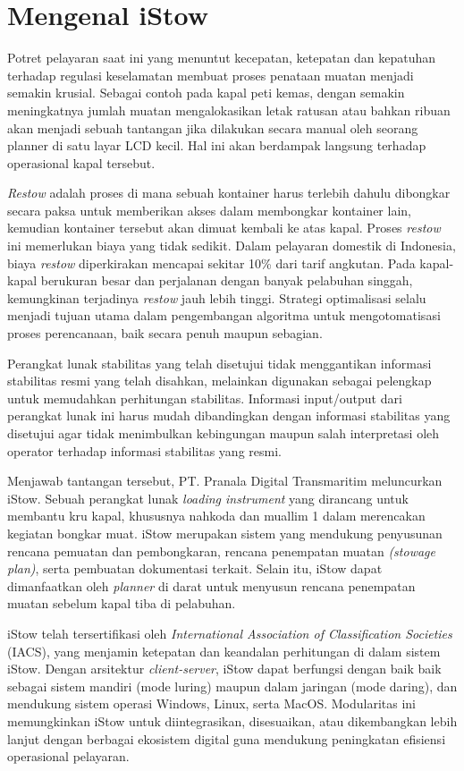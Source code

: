 \chapter{Mengenal iStow}
\label{ch:mengenal-iStow}


Potret pelayaran saat ini yang menuntut kecepatan, ketepatan dan kepatuhan terhadap regulasi keselamatan membuat proses penataan muatan menjadi semakin krusial. Sebagai contoh pada kapal peti kemas, dengan semakin meningkatnya jumlah muatan mengalokasikan letak ratusan atau bahkan ribuan akan menjadi sebuah tantangan jika dilakukan secara manual oleh seorang planner di satu layar LCD kecil. Hal ini akan berdampak langsung terhadap operasional kapal tersebut.

{ \em Restow} adalah proses di mana sebuah kontainer harus terlebih dahulu dibongkar secara paksa untuk memberikan akses dalam membongkar kontainer lain, kemudian kontainer tersebut akan dimuat kembali ke atas kapal. Proses {\em restow} ini memerlukan biaya yang tidak sedikit. Dalam pelayaran domestik di Indonesia, biaya {\em restow} diperkirakan mencapai sekitar 10\% dari tarif angkutan. Pada kapal-kapal berukuran besar dan perjalanan dengan banyak pelabuhan singgah, kemungkinan terjadinya {\em restow} jauh lebih tinggi. Strategi optimalisasi selalu menjadi tujuan utama dalam pengembangan algoritma untuk mengotomatisasi proses perencanaan, baik secara penuh maupun sebagian.

Perangkat lunak stabilitas yang telah disetujui tidak menggantikan informasi stabilitas resmi yang telah disahkan, melainkan digunakan sebagai pelengkap untuk memudahkan perhitungan stabilitas. Informasi input/output dari perangkat lunak ini harus mudah dibandingkan dengan informasi stabilitas yang disetujui agar tidak menimbulkan kebingungan maupun salah interpretasi oleh operator terhadap informasi stabilitas yang resmi.

Menjawab tantangan tersebut, PT. Pranala Digital Transmaritim meluncurkan iStow. Sebuah perangkat lunak {\em loading instrument} yang dirancang untuk membantu kru kapal, khususnya nahkoda dan muallim 1 dalam merencakan kegiatan bongkar muat. iStow merupakan sistem yang mendukung penyusunan rencana pemuatan dan pembongkaran, rencana penempatan muatan {\em(stowage plan)}, serta pembuatan dokumentasi terkait. Selain itu, iStow dapat dimanfaatkan oleh {\em planner} di darat untuk menyusun rencana penempatan muatan sebelum kapal tiba di pelabuhan.

iStow telah tersertifikasi  oleh {\em International Association of Classification Societies} (IACS), yang menjamin ketepatan dan keandalan perhitungan di dalam sistem iStow. Dengan arsitektur {\em client-server}, iStow dapat berfungsi dengan baik baik sebagai sistem mandiri (mode luring) maupun dalam jaringan (mode daring), dan mendukung sistem operasi Windows, Linux, serta MacOS. Modularitas ini memungkinkan iStow untuk diintegrasikan, disesuaikan, atau dikembangkan lebih lanjut dengan berbagai ekosistem digital guna mendukung peningkatan efisiensi operasional pelayaran.\\

